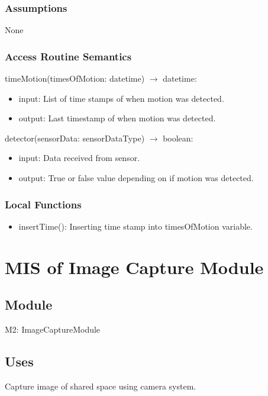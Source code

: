 \documentclass[12pt, titlepage]{article}
\begin{document}
\subsubsection{Assumptions}
None

\subsubsection{Access Routine Semantics}

\noindent timeMotion(timesOfMotion: datetime) $\rightarrow$ datetime:
\begin{itemize}
\item input: List of time stamps of when motion was detected. 
\item output: Last timestamp of when motion was detected. 
\end{itemize}

\noindent detector(sensorData: sensorDataType) $\rightarrow$ boolean:
\begin{itemize}
\item input: Data received from sensor. 
\item output: True or false value depending on if motion was detected. 
\end{itemize}

\subsubsection{Local Functions}

\begin{itemize}
  \item insertTime(): Inserting time stamp into timesOfMotion variable.
\end{itemize}


\newpage


\section{MIS of Image Capture Module} \label{Module} 

\subsection{Module}

M2: ImageCaptureModule

\subsection{Uses}
Capture image of shared space using camera system.
\end{document}
